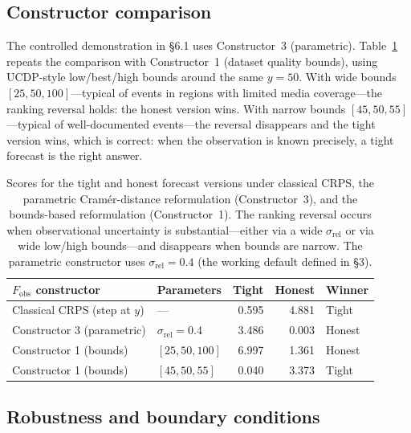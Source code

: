 \subsection{Constructor comparison}

The controlled demonstration in \S6.1 uses Constructor~3 (parametric). Table~\ref{tab:constructor_comparison} repeats the comparison with Constructor~1 (dataset quality bounds), using UCDP-style low/best/high bounds around the same $y=50$. With wide bounds $[25, 50, 100]$---typical of events in regions with limited media coverage---the ranking reversal holds: the honest version wins. With narrow bounds $[45, 50, 55]$---typical of well-documented events---the reversal disappears and the tight version wins, which is correct: when the observation is known precisely, a tight forecast is the right answer.

\begin{table}[h]
    \centering
    \small
    \begin{tabular}{llrrl}
        \toprule
        $F_\text{obs}$ constructor & Parameters & Tight & Honest & Winner \\
        \midrule
        Classical CRPS (step at $y$) & --- & 0.595 & 4.881 & Tight \\
        Constructor 3 (parametric) & $\sigma_\text{rel} = 0.4$ & 3.486 & 0.003 & Honest \\
        Constructor 1 (bounds) & $[25, 50, 100]$ & 6.997 & 1.361 & Honest \\
        Constructor 1 (bounds) & $[45, 50, 55]$ & 0.040 & 3.373 & Tight \\
        \bottomrule
    \end{tabular}
    \caption{Scores for the tight and honest forecast versions under classical CRPS, the parametric Cram\'er-distance reformulation (Constructor~3), and the bounds-based reformulation (Constructor~1). The ranking reversal occurs when observational uncertainty is substantial---either via a wide $\sigma_\text{rel}$ or via wide low/high bounds---and disappears when bounds are narrow. The parametric constructor uses $\sigma_\text{rel} = 0.4$ (the working default defined in \S3).}
    \label{tab:constructor_comparison}
\end{table}

\subsection{Robustness and boundary conditions}

